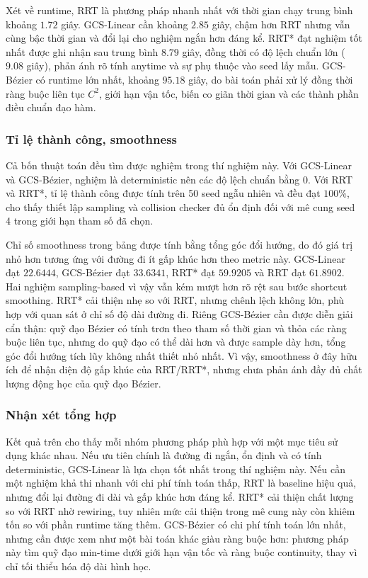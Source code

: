 Xét về runtime, RRT là phương pháp nhanh nhất với thời gian chạy trung bình
khoảng $1.72$ giây. GCS-Linear cần khoảng $2.85$ giây, chậm hơn RRT nhưng vẫn
cùng bậc thời gian và đổi lại cho nghiệm ngắn hơn đáng kể. RRT* đạt nghiệm tốt
nhất được ghi nhận sau trung bình $8.79$ giây, đồng thời có độ lệch chuẩn lớn
($9.08$ giây), phản ánh rõ tính anytime và sự phụ thuộc vào seed lấy mẫu.
GCS-Bézier có runtime lớn nhất, khoảng $95.18$ giây, do bài toán phải xử lý đồng
thời ràng buộc liên tục $C^2$, giới hạn vận tốc, biến co giãn thời gian và các
thành phần điều chuẩn đạo hàm.

\subsubsection{Tỉ lệ thành công, smoothness}

Cả bốn thuật toán đều tìm được nghiệm trong thí nghiệm này. Với GCS-Linear và
GCS-Bézier, nghiệm là deterministic nên các độ lệch chuẩn bằng 0. Với RRT và
RRT*, tỉ lệ thành công được tính trên 50 seed ngẫu nhiên và đều đạt $100\%$,
cho thấy thiết lập sampling và collision checker đủ ổn định đối với mê cung seed
4 trong giới hạn tham số đã chọn.

Chỉ số smoothness trong bảng được tính bằng tổng góc đổi hướng, do đó giá trị
nhỏ hơn tương ứng với đường đi ít gấp khúc hơn theo metric này. GCS-Linear đạt
$22.6444$, GCS-Bézier đạt $33.6341$, RRT* đạt $59.9205$ và RRT đạt $61.8902$.
Hai nghiệm sampling-based vì vậy vẫn kém mượt hơn rõ rệt sau bước shortcut
smoothing. RRT* cải thiện nhẹ so với RRT, nhưng chênh lệch không lớn, phù hợp
với quan sát ở chỉ số độ dài đường đi. Riêng GCS-Bézier cần được diễn giải cẩn
thận: quỹ đạo Bézier có tính trơn theo tham số thời gian và thỏa các ràng
buộc liên tục, nhưng do quỹ đạo có thể dài hơn và được sample dày hơn, tổng góc
đổi hướng tích lũy không nhất thiết nhỏ nhất. Vì vậy, smoothness ở đây hữu ích
để nhận diện độ gấp khúc của RRT/RRT*, nhưng chưa phản ánh đầy đủ chất lượng
động học của quỹ đạo Bézier.

\subsubsection{Nhận xét tổng hợp}

Kết quả trên cho thấy mỗi nhóm phương pháp phù hợp với một mục tiêu sử dụng
khác nhau. Nếu ưu tiên chính là đường đi ngắn, ổn định và có tính deterministic,
GCS-Linear là lựa chọn tốt nhất trong thí nghiệm này. Nếu cần một nghiệm khả thi
nhanh với chi phí tính toán thấp, RRT là baseline hiệu quả, nhưng đổi lại đường
đi dài và gấp khúc hơn đáng kể. RRT* cải thiện chất lượng so với RRT nhờ
rewiring, tuy nhiên mức cải thiện trong mê cung này còn khiêm tốn so với phần
runtime tăng thêm. GCS-Bézier có chi phí tính toán lớn nhất, nhưng cần được xem
như một bài toán khác giàu ràng buộc hơn: phương pháp này tìm quỹ đạo
min-time dưới giới hạn vận tốc và ràng buộc continuity, thay vì chỉ tối thiểu
hóa độ dài hình học.


